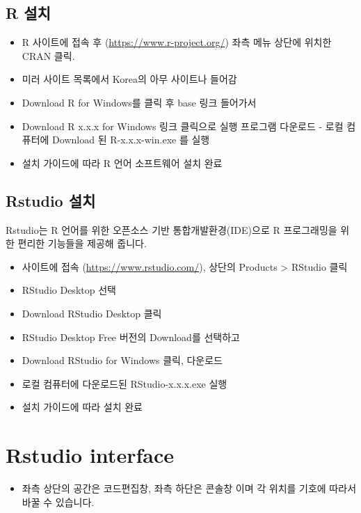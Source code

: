 \documentclass[
]{book}
\providecommand{\tightlist}{%
  \setlength{\itemsep}{0pt}\setlength{\parskip}{0pt}}
\begin{document}
\hypertarget{r-uxc124uxce58}{%
\subsection{R 설치}\label{r-uxc124uxce58}}

\begin{itemize}
\tightlist
\item
  R 사이트에 접속 후 (\url{https://www.r-project.org/}) 좌측 메뉴 상단에 위치한 CRAN 클릭.
\item
  미러 사이트 목록에서 Korea의 아무 사이트나 들어감
\item
  Download R for Windows를 클릭 후 base 링크 들어가서
\item
  Download R x.x.x for Windows 링크 클릭으로 실행 프로그램 다운로드 - 로컬 컴퓨터에 Download 된 R-x.x.x-win.exe 를 실행
\item
  설치 가이드에 따라 R 언어 소프트웨어 설치 완료
\end{itemize}

\hypertarget{rstudio-uxc124uxce58}{%
\subsection{Rstudio 설치}\label{rstudio-uxc124uxce58}}

Rstudio는 R 언어를 위한 오픈소스 기반 통합개발환경(IDE)으로 R 프로그래밍을 위한 편리한 기능들을 제공해 줍니다.

\begin{itemize}
\tightlist
\item
  사이트에 접속 (\url{https://www.rstudio.com/}), 상단의 Products \textgreater{} RStudio 클릭
\item
  RStudio Desktop 선택
\item
  Download RStudio Desktop 클릭
\item
  RStudio Desktop Free 버전의 Download를 선택하고
\item
  Download RStudio for Windows 클릭, 다운로드
\item
  로컬 컴퓨터에 다운로드된 RStudio-x.x.x.exe 실행
\item
  설치 가이드에 따라 설치 완료
\end{itemize}

\hypertarget{rstudio-interface}{%
\section{Rstudio interface}\label{rstudio-interface}}

\begin{itemize}
\tightlist
\item
  좌측 상단의 공간은 코드편집창, 좌측 하단은 콘솔창 이며 각 위치를 기호에 따라서 바꿀 수 있습니다.
\end{itemize}
\end{document}
